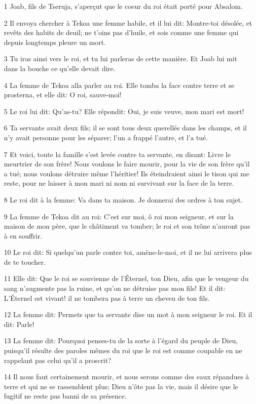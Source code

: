 \par 1 Joab, fils de Tseruja, s'aperçut que le coeur du roi était porté pour Absalom.
\par 2 Il envoya chercher à Tekoa une femme habile, et il lui dit: Montre-toi désolée, et revêts des habits de deuil; ne t'oins pas d'huile, et sois comme une femme qui depuis longtemps pleure un mort.
\par 3 Tu iras ainsi vers le roi, et tu lui parleras de cette manière. Et Joab lui mit dans la bouche ce qu'elle devait dire.
\par 4 La femme de Tekoa alla parler au roi. Elle tomba la face contre terre et se prosterna, et elle dit: O roi, sauve-moi!
\par 5 Le roi lui dit: Qu'as-tu? Elle répondit: Oui, je suis veuve, mon mari est mort!
\par 6 Ta servante avait deux fils; il se sont tous deux querellés dans les champs, et il n'y avait personne pour les séparer; l'un a frappé l'autre, et l'a tué.
\par 7 Et voici, toute la famille s'est levée contre ta servante, en disant: Livre le meurtrier de son frère! Nous voulons le faire mourir, pour la vie de son frère qu'il a tué; nous voulons détruire même l'héritier! Ils éteindraient ainsi le tison qui me reste, pour ne laisser à mon mari ni nom ni survivant sur la face de la terre.
\par 8 Le roi dit à la femme: Va dans ta maison. Je donnerai des ordres à ton sujet.
\par 9 La femme de Tekoa dit au roi: C'est sur moi, ô roi mon seigneur, et sur la maison de mon père, que le châtiment va tomber; le roi et son trône n'auront pas à en souffrir.
\par 10 Le roi dit: Si quelqu'un parle contre toi, amène-le-moi, et il ne lui arrivera plus de te toucher.
\par 11 Elle dit: Que le roi se souvienne de l'Éternel, ton Dieu, afin que le vengeur du sang n'augmente pas la ruine, et qu'on ne détruise pas mon fils! Et il dit: L'Éternel est vivant! il ne tombera pas à terre un cheveu de ton fils.
\par 12 La femme dit: Permets que ta servante dise un mot à mon seigneur le roi. Et il dit: Parle!
\par 13 La femme dit: Pourquoi penses-tu de la sorte à l'égard du peuple de Dieu, puisqu'il résulte des paroles mêmes du roi que le roi est comme coupable en ne rappelant pas celui qu'il a proscrit?
\par 14 Il nous faut certainement mourir, et nous serons comme des eaux répandues à terre et qui ne se rassemblent plus; Dieu n'ôte pas la vie, mais il désire que le fugitif ne reste pas banni de sa présence.
